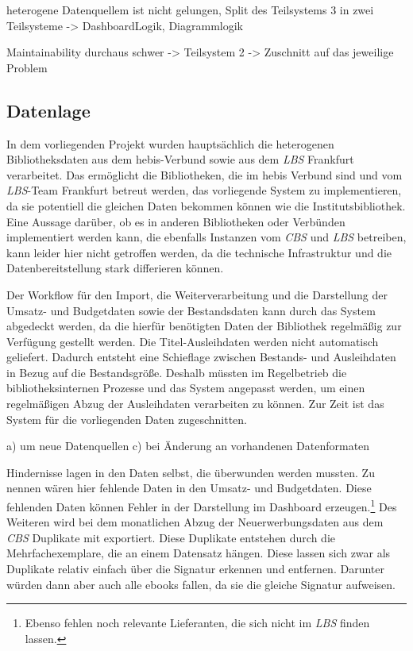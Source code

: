 heterogene Datenquellem
ist nicht gelungen, 
Split des Teilsystems 3 in zwei Teilsysteme -> DashboardLogik, Diagrammlogik

Maintainability durchaus schwer -> Teilsystem 2 -> Zuschnitt auf das jeweilige Problem

\subsection{Datenlage}
In dem vorliegenden Projekt wurden hauptsächlich die heterogenen Bibliotheksdaten aus dem hebis-Verbund sowie aus dem \textit{\acrlong{LBS}} Frankfurt verarbeitet.
Das ermöglicht die Bibliotheken, die im hebis Verbund sind und vom \textit{\acrshort{LBS}}-Team Frankfurt betreut werden, das vorliegende System zu implementieren,
da sie potentiell die gleichen Daten bekommen können wie die Institutsbibliothek. Eine Aussage darüber, ob es in anderen Bibliotheken oder Verbünden implementiert werden kann, die ebenfalls
Instanzen vom \textit{\acrlong{CBS}} und \textit{\acrshort{LBS}} betreiben, kann leider hier nicht getroffen werden, da die technische Infrastruktur
und die Datenbereitstellung stark differieren können. 

Der Workflow für den Import, die Weiterverarbeitung und die Darstellung der Umsatz- und Budgetdaten sowie der Bestandsdaten kann durch das System
abgedeckt werden, da die hierfür benötigten Daten der Bibliothek regelmäßig zur Verfügung gestellt werden. Die Titel-Ausleihdaten werden nicht automatisch
geliefert. Dadurch entsteht eine Schieflage zwischen Bestands- und Ausleihdaten in Bezug auf die Bestandsgröße.
Deshalb müssten im Regelbetrieb die bibliotheksinternen Prozesse und das System angepasst werden, um einen regelmäßigen Abzug der Ausleihdaten
verarbeiten zu können. Zur Zeit ist das System für die vorliegenden Daten zugeschnitten.

a) um neue Datenquellen
c) bei Änderung an vorhandenen Datenformaten

Hindernisse lagen in den Daten selbst, die überwunden werden mussten. Zu nennen wären hier fehlende Daten in den Umsatz- und Budgetdaten.
Diese fehlenden Daten können Fehler in der Darstellung im Dashboard erzeugen.\footnote{Ebenso fehlen noch relevante Lieferanten, die sich nicht im \textit{\acrshort{LBS}} finden lassen.}
Des Weiteren wird bei dem monatlichen Abzug der Neuerwerbungsdaten aus dem \textit{\acrshort{CBS}} Duplikate mit exportiert. Diese Duplikate entstehen durch
die Mehrfachexemplare, die an einem Datensatz hängen. Diese lassen sich zwar als Duplikate relativ einfach über die Signatur erkennen und entfernen.
Darunter würden dann  aber auch alle ebooks fallen, da sie die gleiche Signatur aufweisen.

